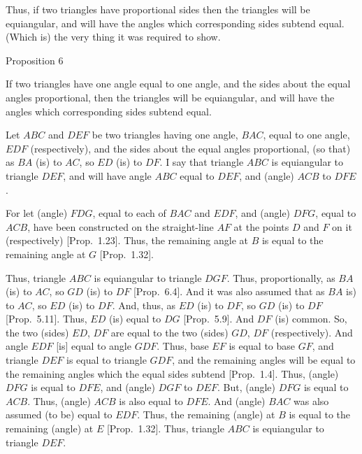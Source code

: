 Thus,  if two triangles have proportional sides then the
triangles will be equiangular, and will have the angles which  corresponding sides
subtend  equal. (Which is) the very thing it was required to show.


\begin{center}
{\large Proposition 6}
\end{center}

If two triangles have one angle equal to one angle,
and the sides about the equal angles proportional, then the triangles will
be equiangular, and will have the angles which corresponding sides subtend equal.

\epsfysize=2.2in
\centerline{}

Let $ABC$ and $DEF$ be two triangles having one angle, $BAC$, equal to
one angle, $EDF$ (respectively), and the sides about the equal angles proportional,
(so that) as $BA$ (is) to $AC$, so $ED$ (is) to $DF$. I say that triangle $ABC$ is
equiangular to triangle $DEF$, and will have angle $ABC$ equal to
$DEF$, and (angle) $ACB$ to $DFE$.

For let (angle) $FDG$, equal to each of $BAC$ and $EDF$, and (angle) $DFG$, equal to $ACB$, have been constructed on the
straight-line $AF$ at the points $D$ and $F$ on it (respectively)   [Prop.~1.23]. Thus, the remaining angle at $B$
is equal to the remaining angle at $G$  [Prop.~1.32].

Thus, triangle $ABC$ is equiangular to triangle $DGF$. Thus, proportionally,
as $BA$ (is) to $AC$, so $GD$ (is) to $DF$ [Prop.~6.4].  And it was also assumed that as $BA$
is) to $AC$, so $ED$ (is) to $DF$. And, thus, as $ED$ (is) to $DF$, so $GD$ (is) to $DF$ [Prop.~5.11]. Thus, $ED$ (is) equal to $DG$ [Prop.~5.9]. And $DF$ (is) common. So, the two
(sides) $ED$, $DF$ are equal to the two (sides) $GD$, $DF$ (respectively). And 
angle $EDF$ [is] equal to  angle $GDF$. Thus,  base $EF$ is equal to
base $GF$, and triangle $DEF$ is equal to triangle $GDF$, and the remaining
angles will be equal to the remaining angles which the equal sides subtend
 [Prop.~1.4]. Thus, (angle) $DFG$ is equal to $DFE$, and (angle) $DGF$ to
$DEF$. But, (angle) $DFG$ is equal to $ACB$. Thus, (angle) $ACB$ is also equal
to $DFE$. And  (angle) $BAC$ was also assumed (to be) equal to $EDF$. 
Thus, the remaining (angle) at $B$ is equal to the remaining (angle) at $E$  [Prop.~1.32]. Thus, triangle $ABC$ is equiangular to triangle $DEF$.

